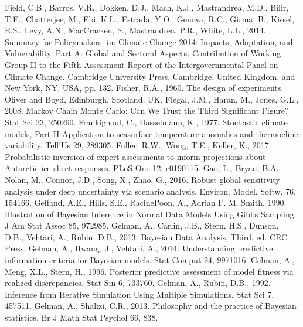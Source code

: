 \documentclass[letterpaper,10pt,english]{sphinxmanual}
\begin{document}
Field, C.B., Barros, V.R., Dokken, D.J., Mach, K.J., Mastrandrea, M.D., Bilir, T.E., Chatterjee, M., Ebi, K.L., Estrada, Y.O., Genova, R.C., Girma, B., Kissel, E.S., Levy, A.N., MacCracken, S., Mastrandrea, P.R., White, L.L., 2014. Summary for Policymakers, in: Climate Change 2014: Impacts, Adaptation, and Vulnerability. Part A: Global and Sectoral Aspects. Contribution of Working Group II to the Fifth Assessment Report of the Intergovernmental Panel on Climate Change. Cambridge University Press, Cambridge, United Kingdom, and New York, NY, USA, pp. 1\textendash{}32.
Fisher, R.A., 1960. The design of experiments. Oliver and Boyd, Edinburgh, Scotland, UK.
Flegal, J.M., Haran, M., Jones, G.L., 2008. Markov Chain Monte Carlo: Can We Trust the Third Significant Figure? Stat Sci 23, 250\textendash{}260. 
Frankignoul, C., Hasselmann, K., 1977. Stochastic climate models, Part II Application to sea\sphinxhyphen{}surface temperature anomalies and thermocline variability. Tell’Us 29, 289\textendash{}305. 
Fuller, R.W., Wong, T.E., Keller, K., 2017. Probabilistic inversion of expert assessments to inform projections about Antarctic ice sheet responses. PLoS One 12, e0190115. 
Gao, L., Bryan, B.A., Nolan, M., Connor, J.D., Song, X., Zhao, G., 2016. Robust global sensitivity analysis under deep uncertainty via scenario analysis. Environ. Model. Softw. 76, 154\textendash{}166. 
Gelfand, A.E., Hills, S.E., Racine\sphinxhyphen{}Poon, A., Adrian F. M. Smith, 1990. Illustration of Bayesian Inference in Normal Data Models Using Gibbs Sampling. J Am Stat Assoc 85, 972\textendash{}985. 
Gelman, A., Carlin, J.B., Stern, H.S., Dunson, D.B., Vehtari, A., Rubin, D.B., 2013. Bayesian Data Analysis, Third. ed. CRC Press.
Gelman, A., Hwang, J., Vehtari, A., 2014. Understanding predictive information criteria for Bayesian models. Stat Comput 24, 997\textendash{}1016. 
Gelman, A., Meng, X.\sphinxhyphen{}L., Stern, H., 1996. Posterior predictive assessment of model fitness via realized discrepancies. Stat Sin 6, 733\textendash{}760.
Gelman, A., Rubin, D.B., 1992. Inference from Iterative Simulation Using Multiple Simulations. Stat Sci 7, 457\textendash{}511. 
Gelman, A., Shalizi, C.R., 2013. Philosophy and the practice of Bayesian statistics. Br J Math Stat Psychol 66, 8\textendash{}38. 
\end{document}
